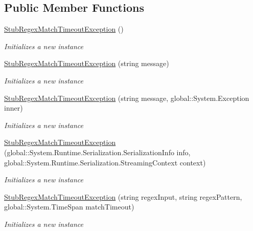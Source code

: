 \subsection*{Public Member Functions}
\begin{DoxyCompactItemize}
\item 
\hyperlink{class_system_1_1_text_1_1_regular_expressions_1_1_fakes_1_1_stub_regex_match_timeout_exception_a999f506925e9bcc5dc44c8f23f9a15d9}{Stub\-Regex\-Match\-Timeout\-Exception} ()
\begin{DoxyCompactList}\small\item\em Initializes a new instance\end{DoxyCompactList}\item 
\hyperlink{class_system_1_1_text_1_1_regular_expressions_1_1_fakes_1_1_stub_regex_match_timeout_exception_a85d8418296606a5cb1fc3df60d3c21d4}{Stub\-Regex\-Match\-Timeout\-Exception} (string message)
\begin{DoxyCompactList}\small\item\em Initializes a new instance\end{DoxyCompactList}\item 
\hyperlink{class_system_1_1_text_1_1_regular_expressions_1_1_fakes_1_1_stub_regex_match_timeout_exception_abc78320f24b58417cd91a16a10421c5a}{Stub\-Regex\-Match\-Timeout\-Exception} (string message, global\-::\-System.\-Exception inner)
\begin{DoxyCompactList}\small\item\em Initializes a new instance\end{DoxyCompactList}\item 
\hyperlink{class_system_1_1_text_1_1_regular_expressions_1_1_fakes_1_1_stub_regex_match_timeout_exception_a0914d67678cd95c8b9b413dd2632c753}{Stub\-Regex\-Match\-Timeout\-Exception} (global\-::\-System.\-Runtime.\-Serialization.\-Serialization\-Info info, global\-::\-System.\-Runtime.\-Serialization.\-Streaming\-Context context)
\begin{DoxyCompactList}\small\item\em Initializes a new instance\end{DoxyCompactList}\item 
\hyperlink{class_system_1_1_text_1_1_regular_expressions_1_1_fakes_1_1_stub_regex_match_timeout_exception_a562b539dbce82810506e87eff45dbd54}{Stub\-Regex\-Match\-Timeout\-Exception} (string regex\-Input, string regex\-Pattern, global\-::\-System.\-Time\-Span match\-Timeout)
\begin{DoxyCompactList}\small\item\em Initializes a new instance\end{DoxyCompactList}\item 

\end{DoxyCompactItemize}
